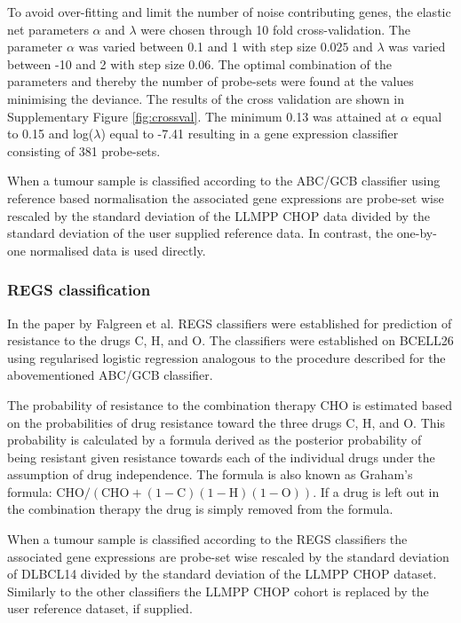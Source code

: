 \documentclass[10pt]{bmc_article}
\newenvironment{bmcformat}{\fussy\setboolean{publ}{true}}{\fussy}
\begin{document}
\begin{bmcformat}
To avoid over-fitting and limit the number of noise contributing genes, the elastic net parameters $\alpha$ and $\lambda$ were chosen through 10 fold cross-validation. The parameter $\alpha$ was varied between 0.1 and 1 with step size $0.025$ and $\lambda$ was varied between -10 and 2 with step size $0.06$. The optimal combination of the parameters and thereby the number of probe-sets were found at the values minimising the deviance. The results of the cross validation are shown in Supplementary Figure \ref{fig:crossval}. The minimum 0.13 was attained at $\alpha$ equal to 0.15 and log($\lambda$) equal to -7.41 resulting in a gene expression classifier consisting of 381 probe-sets.

When a tumour sample is classified according to the ABC/GCB classifier using reference based normalisation the associated gene expressions are probe-set wise rescaled by the standard deviation of the LLMPP CHOP data divided by the standard deviation of the user supplied reference data. In contrast, the one-by-one normalised data is used directly.

\subsubsection*{REGS classification}
In the paper by Falgreen et al. \cite{Falgreen2013c} REGS classifiers were established for prediction of resistance to the drugs C, H, and O. The classifiers were established on BCELL26 using regularised logistic regression analogous to the procedure described for the abovementioned ABC/GCB classifier.

The probability of resistance to the combination therapy CHO is estimated based on the probabilities of drug resistance toward the three drugs C, H, and O. This probability is calculated by a formula derived as the posterior probability of being resistant given resistance towards each of the individual drugs under the assumption of drug independence. The formula is also known as Graham's formula: $\mbox{CHO}/(\mbox{CHO}+(1-\mbox{C})(1-\mbox{H})(1-\mbox{O}))$. If a drug is left out in the combination therapy the drug is simply removed from the formula.

When a tumour sample is classified according to the REGS classifiers the associated gene expressions are probe-set wise rescaled by the standard deviation of DLBCL14 divided by the standard deviation of the LLMPP CHOP dataset. Similarly to the other classifiers the LLMPP CHOP cohort is replaced by the user reference dataset, if supplied.



\end{bmcformat}
\end{document}

